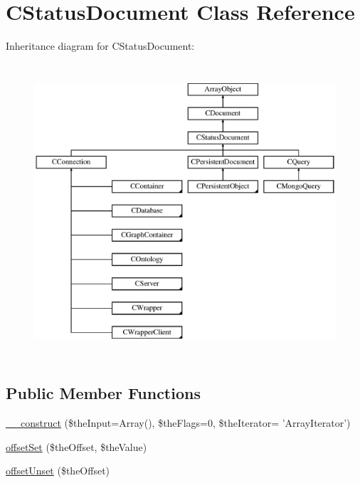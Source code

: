 \hypertarget{class_c_status_document}{\section{C\-Status\-Document Class Reference}
\label{class_c_status_document}
}
Inheritance diagram for C\-Status\-Document\-:\begin{figure}[H]
\begin{center}
\leavevmode
\includegraphics[height=11.000000cm]{class_c_status_document}
\end{center}
\end{figure}
\subsection*{Public Member Functions}
\begin{DoxyCompactItemize}
\item 
\hyperlink{class_c_status_document_a467c5b8ae2c40413cc918c69027bd43f}{\-\_\-\-\_\-construct} (\$the\-Input=Array(), \$the\-Flags=0, \$the\-Iterator= 'Array\-Iterator')
\item 
\hyperlink{class_c_status_document_a5c9a849e62516905de7a310960015a4b}{offset\-Set} (\$the\-Offset, \$the\-Value)
\item 
\hyperlink{class_c_status_document_afcc308cc116245a8c5a2eccc7fc2b1f1}{offset\-Unset} (\$the\-Offset)
\end{DoxyCompactItemize}

